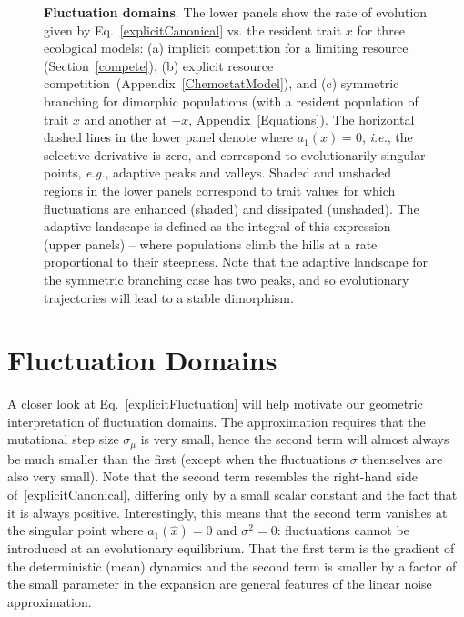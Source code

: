 \begin{figure}
\begin{center}
	\caption{\textbf{Fluctuation domains}.   The lower panels show the rate of 
evolution given by Eq.~\eqref{explicitCanonical} vs. the resident trait $x$ for three ecological models: 
(a) implicit competition for a limiting resource (Section~\ref{compete}), 
(b) explicit resource competition~(Appendix~\ref{ChemostatModel}), and 
(c) symmetric branching for dimorphic populations (with a resident population of trait $x$ and another at $-x$, Appendix~\ref{Equations}).  The horizontal dashed lines in the lower panel denote where $a_1(x)=0$, \emph{i.e.}, the selective derivative is zero, and 
correspond to evolutionarily singular points, \emph{e.g.}, adaptive peaks and valleys.
Shaded and unshaded regions in the lower panels correspond to trait values for
which fluctuations are enhanced (shaded) and dissipated (unshaded).
The adaptive landscape is defined as the integral of this expression (upper panels) -- where populations climb the hills at a rate proportional to their steepness.  Note that
the adaptive landscape for the symmetric branching case has two peaks, and so
evolutionary trajectories will lead to a stable dimorphism.}\label{1}
\end{center}
\end{figure}
 
 
 
\section{Fluctuation Domains}
 
A closer look at Eq.~\eqref{explicitFluctuation} will help motivate our geometric interpretation of fluctuation domains.  The approximation requires that the mutational step size $\sigma_{\mu}$ is very small, hence the second term will almost always be much smaller than the first (except when the fluctuations $\sigma$ themselves are also very small). Note that the second term resembles the right-hand side of~\eqref{explicitCanonical}, differing only by a small scalar constant and the fact that it is always positive.  Interestingly, this means that the second term vanishes at the singular point where $a_1(\hat x) = 0$ and $\sigma^2=0$: fluctuations cannot be introduced at an evolutionary equilibrium.
That the first term is the gradient of the deterministic (mean) dynamics and the second term is smaller by a factor of the small parameter in the expansion are general features of the linear noise approximation.  
 
